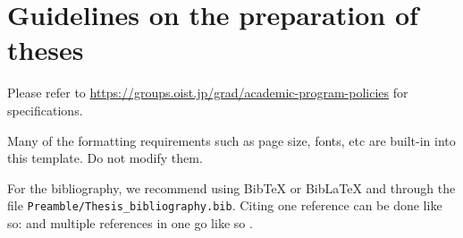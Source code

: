 
\section{Guidelines on the preparation of theses} \label{ch-1}
Please refer to \url{https://groups.oist.jp/grad/academic-program-policies} for specifications.

Many of the formatting requirements such as page size, fonts, etc are built-in into this template. Do not modify them.

For the bibliography, we recommend using BibTeX or BibLaTeX and through the file \texttt{Preamble/Thesis\_bibliography.bib}. Citing one reference can be done like so: \cite{Lee98} and multiple references in one go like so \cite{Fil09, Muc10, Kra27}.
